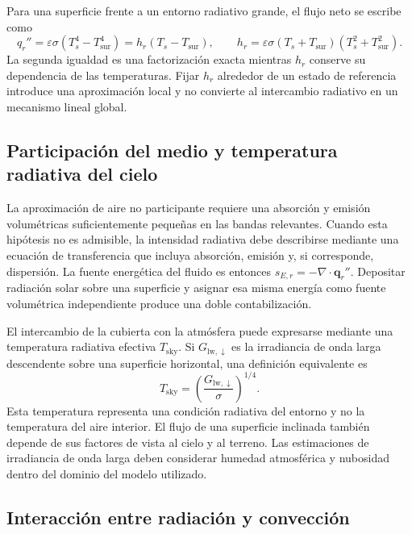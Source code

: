Para una superficie frente a un entorno radiativo grande, el flujo neto se escribe como
\begin{equation}
q_r''=\varepsilon\sigma(T_s^4-T_{\mathrm{sur}}^4)
=h_r(T_s-T_{\mathrm{sur}}),
\qquad
h_r=\varepsilon\sigma(T_s+T_{\mathrm{sur}})(T_s^2+T_{\mathrm{sur}}^2).
\label{eq:hr}
\end{equation}
La segunda igualdad es una factorización exacta mientras $h_r$ conserve su dependencia de las temperaturas. Fijar $h_r$ alrededor de un estado de referencia introduce una aproximación local y no convierte al intercambio radiativo en un mecanismo lineal global.

\subsection{Participación del medio y temperatura radiativa del cielo}

La aproximación de aire no participante requiere una absorción y emisión volumétricas suficientemente pequeñas en las bandas relevantes. Cuando esta hipótesis no es admisible, la intensidad radiativa debe describirse mediante una ecuación de transferencia que incluya absorción, emisión y, si corresponde, dispersión. La fuente energética del fluido es entonces $s_{E,r}=-\nabla\cdot\mathbf q_r''$. Depositar radiación solar sobre una superficie y asignar esa misma energía como fuente volumétrica independiente produce una doble contabilización.

El intercambio de la cubierta con la atmósfera puede expresarse mediante una temperatura radiativa efectiva $T_{\mathrm{sky}}$. Si $G_{\mathrm{lw},\downarrow}$ es la irradiancia de onda larga descendente sobre una superficie horizontal, una definición equivalente es
\begin{equation}
T_{\mathrm{sky}}=
\left(\frac{G_{\mathrm{lw},\downarrow}}{\sigma}\right)^{1/4}.
\label{eq:temperatura_cielo}
\end{equation}
Esta temperatura representa una condición radiativa del entorno y no la temperatura del aire interior. El flujo de una superficie inclinada también depende de sus factores de vista al cielo y al terreno. Las estimaciones de irradiancia de onda larga deben considerar humedad atmosférica y nubosidad dentro del dominio del modelo utilizado.

\subsection{Interacción entre radiación y convección}

